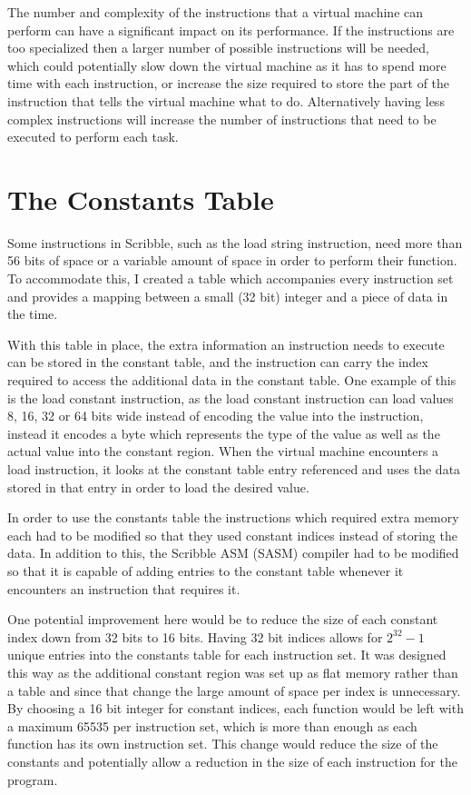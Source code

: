 \documentclass[]{final_report}
\begin{document}
The number and complexity of the instructions that a virtual machine can perform can have a significant impact on its performance. If the instructions are too specialized then a larger number of possible instructions will be needed, which could potentially slow down the virtual machine as it has to spend more time with each instruction, or increase the size required to store the part of the instruction that tells the virtual machine what to do. Alternatively having less complex instructions will increase the number of instructions that need to be executed to perform each task.

\section{The Constants Table}

Some instructions in Scribble, such as the load string instruction, need more than 56 bits of space or a variable amount of space in order to perform their function. To accommodate this, I created a table which accompanies every instruction set and provides a mapping between a small (32 bit) integer and a piece of data in the time.

With this table in place, the extra information an instruction needs to execute can be stored in the constant table, and the instruction can carry the index required to access the additional data in the constant table. One example of this is the load constant instruction, as the load constant instruction can load values 8, 16, 32 or 64 bits wide instead of encoding the value into the instruction, instead it encodes a byte which represents the type of the value as well as the actual value into the constant region. When the virtual machine encounters a load instruction, it looks at the constant table entry referenced and uses the data stored in that entry in order to load the desired value.

In order to use the constants table the instructions which required extra memory each had to be modified so that they used constant indices instead of storing the data. In addition to this, the Scribble ASM (SASM) compiler had to be modified so that it is capable of adding entries to the constant table whenever it encounters an instruction that requires it.

One potential improvement here would be to reduce the size of each constant index down from 32 bits to 16 bits. Having 32 bit indices allows for \begin{math}2^{32} - 1\end{math} unique entries into the constants table for each instruction set. It was designed this way as the additional constant region was set up as flat memory rather than a table and since that change the large amount of space per index is unnecessary. By choosing a 16 bit integer for constant indices, each function would be left with a maximum 65535 per instruction set, which is more than enough as each function has its own instruction set. This change would reduce the size of the constants and potentially allow a reduction in the size of each instruction for the program.
\end{document}
